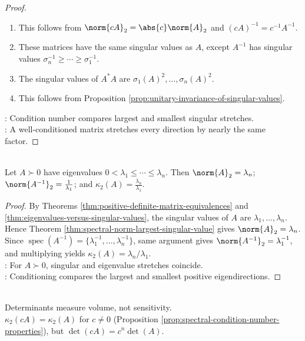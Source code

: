 \begin{proposition}
\begin{proof}
\begin{enumerate}[label=(\roman*)]
\item This follows from $\norm{cA}_2=\abs{c}\norm{A}_2$ and $(cA)^{-1}=c^{-1}A^{-1}$.
\item These matrices have the same singular values as $A$, except $A^{-1}$ has singular values $\sigma_n^{-1}\geq\cdots\geq\sigma_1^{-1}$.
\item The singular values of $A^*A$ are $\sigma_1(A)^2,\ldots,\sigma_n(A)^2$.
\item This follows from Proposition \ref{prop:unitary-invariance-of-singular-values}.
\end{enumerate}
: Condition number compares largest and smallest singular stretches.\\
: A well-conditioned matrix stretches every direction by nearly the same factor.
\end{proof}
\end{proposition}

\begin{corollary} \label{cor:positive-definite-condition-number-eigenvalues} \\
Let $A\succ0$ have eigenvalues $0<\lambda_1\leq\cdots\leq\lambda_n$. Then $\norm{A}_2=\lambda_n$; $\norm{A^{-1}}_2=\frac{1}{\lambda_1}$; and $\kappa_2(A)=\frac{\lambda_n}{\lambda_1}$.
\begin{proof}
By Theorems \ref{thm:positive-definite-matrix-equivalences} and \ref{thm:eigenvalues-versus-singular-values}, the singular values of $A$ are $\lambda_1,\ldots,\lambda_n$.\\
Hence Theorem \ref{thm:spectral-norm-largest-singular-value} gives $\norm{A}_2=\lambda_n$. Since $\operatorname{spec}(A^{-1})=\{\lambda_1^{-1},\ldots,\lambda_n^{-1}\}$, same argument gives $\norm{A^{-1}}_2=\lambda_1^{-1}$, and multiplying yields $\kappa_2(A)=\lambda_n/\lambda_1$.\\
: For $A\succ0$, singular and eigenvalue stretches coincide.\\
: Conditioning compares the largest and smallest positive eigendirections.
\end{proof}
\end{corollary}

\begin{perspective} \label{per:determinant-is-not-conditioning} \\
Determinants measure volume, not sensitivity.\\
$\kappa_2(cA)=\kappa_2(A)$ for $c\neq0$ (Proposition \ref{prop:spectral-condition-number-properties}), but $\det(cA)=c^n\det(A)$.
\end{perspective}

